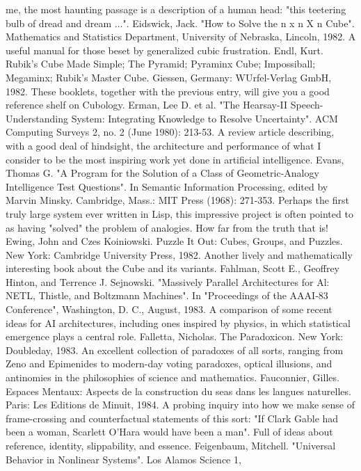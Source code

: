   me, the most haunting passage is a description of a human head: "this teetering bulb of
  dread and dream ...".
Eidswick, Jack. "How to Solve the n x n X n Cube". Mathematics and Statistics Department,
  University of Nebraska, Lincoln, 1982. A useful manual for those beset by generalized
  cubic frustration.
Endl, Kurt. Rubik's Cube Made Simple; The Pyramid; Pyraminx Cube; Impossiball;
  Megaminx; Rubik's Master Cube. Giessen, Germany: WUrfel-Verlag GmbH, 1982. These
  booklets, together with the previous entry, will give you a good reference shelf on
  Cubology.
Erman, Lee D. et al. "The Hearsay-II Speech-Understanding System: Integrating Knowledge
  to Resolve Uncertainty". ACM Computing Surveys 2, no. 2 (June 1980): 213-53. A review
  article describing, with a good deal of hindsight, the architecture and performance of what I
  consider to be the most inspiring work yet done in artificial intelligence.
Evans, Thomas G. "A Program for the Solution of a Class of Geometric-Analogy Intelligence
  Test Questions". In Semantic Information Processing, edited by Marvin
Minsky. Cambridge, Mass.: MIT Press (1968): 271-353. Perhaps the first truly large system
  ever written in Lisp, this impressive project is often pointed to as having "solved" the
  problem of analogies. How far from the truth that is!
Ewing, John and Czes Koiniowski. Puzzle It Out: Cubes, Groups, and Puzzles. New York:
  Cambridge University Press, 1982. Another lively and mathematically interesting book
  about the Cube and its variants.
Fahlman, Scott E., Geoffrey Hinton, and Terrence J. Sejnowski. "Massively Parallel
  Architectures for Al: NETL, Thistle, and Boltzmann Machines". In "Proceedings of the
  AAAI-83 Conference", Washington, D. C., August, 1983. A comparison of some recent
  ideas for AI architectures, including ones inspired by physics, in which statistical
  emergence plays a central role.
Falletta, Nicholas. The Paradoxicon. New York: Doubleday, 1983. An excellent collection of
  paradoxes of all sorts, ranging from Zeno and Epimenides to modern-day voting paradoxes,
  optical illusions, and antinomies in the philosophies of science and mathematics.
Fauconnier, Gilles. Espaces Mentaux: Aspects de la construction du seas dans les langues
  naturelles. Paris: Les Editions de Minuit, 1984. A probing inquiry into how we make sense
  of frame-crossing and counterfactual statements of this sort: "If Clark Gable had been a
  woman, Scarlett O'Hara would have been a man". Full of ideas about reference, identity,
  slippability, and essence.
Feigenbaum, Mitchell. "Universal Behavior in Nonlinear Systems". Los Alamos Science 1,
